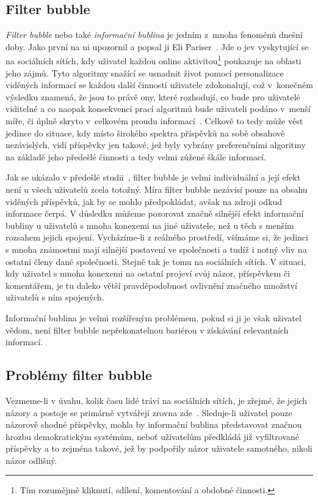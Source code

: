 \documentclass[12pt, a4paper]{article}
\numberwithin{equation}{section} 	%
\begin{document}
\subsection{Filter bubble}
\noindent \textit{Filter bubble} nebo také \textit{informační bublina} je jedním z mnoha fenoménů dnešní doby. Jako první na ni upozornil a popsal ji Eli Pariser~\cite{Pariser2011, PariserTed}. Jde o jev vyskytující se na sociálních sítích, kdy uživatel každou online aktivitou\footnote{Tím rozumějmě kliknutí, sdílení, komentování a obdobné činnosti.} poukazuje na oblasti jeho zájmů. Tyto algoritmy snažící se usnadnit život pomocí personalizace viděných informací se každou další činností uživatele zdokonalují, což v konečném výsledku znamená, že jsou to právě ony, které rozhodují, co bude pro uživatelé viditelné a co naopak konsekvencí prací algoritmů bude uživateli podáno v menší míře, či úplně skryto v celkovém proudu informací~\cite{TheImpactOfFilterBubble}. Celkově to tedy může vést jedince do situace, kdy místo širokého spektra příspěvků na sobě obsahově nezávislých, vidí příspěvky jen takové, jež byly vybrány preferenčními algoritmy na základě jeho předešlé činnosti a tedy velmi zúžené škále informací.

Jak se ukázalo v předešlé studii~\cite{TheImpactOfFilterBubble}, filter bubble je velmi individuální a její efekt není u všech uživatelů zcela totožný. Míra filter bubble nezávisí pouze na obsahu viděných příspěvků, jak by se mohlo předpokládat, avšak na zdroji odkud informace čerpá. V důsledku můžeme pozorovat značně silnější efekt informační bubliny u uživatelů s mnoha konexemi na jiné uživatele, než u těch s menším rozsahem jejich spojení. Vycházíme-li z reálného prostředí, všímáme si, že jedinci s mnoha známostmi mají silnější postavení ve společnosti a tudíž i notný vliv na ostatní členy dané společnosti. Stejně tak je tomu na sociálních sítích. V situaci, kdy uživatel s mnoha konexemi na ostatní projeví svůj názor, příspěvkem či komentářem, je tu daleko větší pravděpodobnost ovlivnění značného množství uživatelů s ním spojených.

Informační bublina je velmi rozšířeným problémem, pokud si ji je však uživatel vědom, není filter bubble nepřekonatelnou bariérou v získávání relevantních informací.


\subsection{Problémy filter bubble}
Vezmeme-li v úvahu, kolik času lidé tráví na sociálních sítích, je zřejmé, že jejich názory a postoje se primárně vytvářejí zrovna zde~\cite{TheImpactOfFilterBubble, BeyondFilterBubble, whyNewsOnTwitter}. Sleduje-li uživatel pouze názorově shodné příspěvky, mohla by informační bublina před\-sta\-vo\-vat značnou hrozbu demokratickým systémům, neboť uživatelům předkládá již vyfiltrované příspěvky a to zejména takové, jež by podpořily názor uživatele samotného, nikoli názor odlišný.
\end{document}
